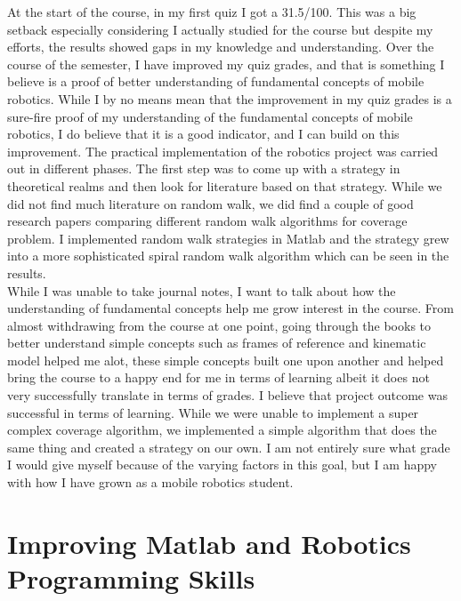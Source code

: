 \documentclass[12pt]{article}
\begin{document}
At the start of the course, in my first quiz I got a 31.5/100. This was a big
setback especially considering I actually studied for the course but despite my
efforts, the results showed gaps in my knowledge and understanding. Over the
course of the semester, I have improved my quiz grades, and that is something I
believe is a proof of better understanding of fundamental concepts of mobile
robotics. While I by no means mean that the improvement in my quiz grades is a
sure-fire proof of my understanding of the fundamental concepts of mobile
robotics, I do believe that it is a good indicator, and I can build on this
improvement. The practical implementation of the robotics project was carried
out in different phases. The first step was to come up with a strategy in
theoretical realms and then look for literature based on that strategy. While
we did not find much literature on random walk, we did find a couple of good
research papers comparing different random walk algorithms for coverage
problem. I implemented random walk strategies in Matlab and the strategy grew
into a more sophisticated spiral random walk algorithm which can be seen in the
results. \newline \\ While I was unable to take journal notes, I want to talk
about how the understanding of fundamental concepts help me grow interest in
the course. From almost withdrawing from the course at one point, going through
the books to better understand simple concepts such as frames of reference and
kinematic model helped me alot, these simple concepts built one upon another
and helped bring the course to a happy end for me in terms of learning albeit
it does not very successfully translate in terms of grades. I believe that
project outcome was successful in terms of learning. While we were unable to
implement a super complex coverage algorithm, we implemented a simple algorithm
that does the same thing and created a strategy on our own. I am not entirely
sure what grade I would give myself because of the varying factors in this
goal, but I am happy with how I have grown as a mobile robotics student.

\section{Improving Matlab and Robotics Programming Skills}
\end{document}
